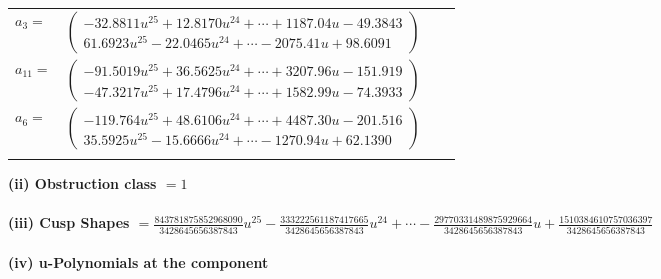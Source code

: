 \documentclass[1p]{elsarticle_modified}
\theoremstyle{definition}
\begin{document}
\begin{tabular}{m{7pt} m{180pt} m{7pt} m{180pt} }
\flushright $a_{3}=$&$\begin{pmatrix}-32.8811 u^{25}+12.8170 u^{24}+\cdots+1187.04 u-49.3843\\61.6923 u^{25}-22.0465 u^{24}+\cdots-2075.41 u+98.6091\end{pmatrix}$ \\
\flushright $a_{11}=$&$\begin{pmatrix}-91.5019 u^{25}+36.5625 u^{24}+\cdots+3207.96 u-151.919\\-47.3217 u^{25}+17.4796 u^{24}+\cdots+1582.99 u-74.3933\end{pmatrix}$ \\
\flushright $a_{6}=$&$\begin{pmatrix}-119.764 u^{25}+48.6106 u^{24}+\cdots+4487.30 u-201.516\\35.5925 u^{25}-15.6666 u^{24}+\cdots-1270.94 u+62.1390\end{pmatrix}$\\&\end{tabular}
\flushleft \textbf{(ii) Obstruction class $= 1$}\\~\\
\flushleft \textbf{(iii) Cusp Shapes $= \frac{843781875852968090}{3428645656387843} u^{25}-\frac{333222561187417665}{3428645656387843} u^{24}+\cdots-\frac{29770331489875929664}{3428645656387843} u+\frac{1510384610757036397}{3428645656387843}$}\\~\\
\newpage\renewcommand{\arraystretch}{1}
\flushleft \textbf{(iv) u-Polynomials at the component}\newline \\
\end{document}
